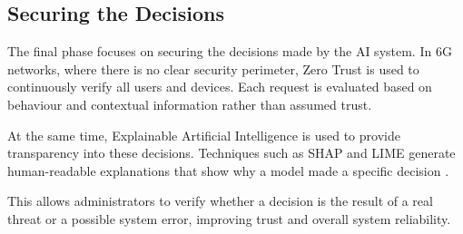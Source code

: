 \documentclass[letterpaper]{article} %
\begin{document}
\subsection {Securing the Decisions}

The final phase focuses on securing the decisions made by the AI system. In 6G networks, where there is no clear security perimeter, Zero Trust is used to continuously verify all users and devices. Each request is evaluated based on behaviour and contextual information rather than assumed trust.

At the same time, Explainable Artificial Intelligence is used to provide transparency into these decisions. Techniques such as SHAP and LIME generate human-readable explanations that show why a model made a specific decision \cite{Kumar_Dutta_Vamsi_Sankararao_Varri_Puthal_2026}.

This allows administrators to verify whether a decision is the result of a real threat or a possible system error, improving trust and overall system reliability.


\end{document}
